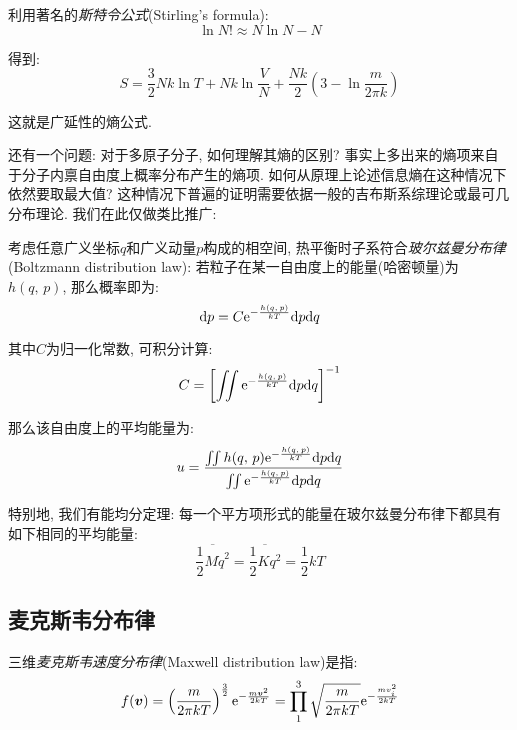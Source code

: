 利用著名的\emph{斯特令公式}(Stirling's formula):
\[\ln N!\approx N\ln N-N\]

得到:
\[S=\frac{3}{2}Nk\ln T+Nk\ln \frac{V}{N}+\frac{Nk}{2}\left(3-\ln{\frac{m}{2\pi k}}\right)\]

这就是广延性的熵公式.

还有一个问题: 对于多原子分子, 如何理解其熵的区别? 事实上多出来的熵项来自于分子内禀自由度上概率分布产生的熵项. 如何从原理上论述信息熵在这种情况下依然要取最大值? 这种情况下普遍的证明需要依据一般的吉布斯系综理论或最可几分布理论. 我们在此仅做类比推广: 

考虑任意广义坐标$q$和广义动量$p$构成的相空间, 热平衡时子系符合\emph{玻尔兹曼分布律}(Boltzmann distribution law): 若粒子在某一自由度上的能量(哈密顿量)为$h(q,\,p)$, 那么概率即为:
\[\textrm{d} p=C{\rm e}^{-\frac{h(q,\,p)}{kT}}\textrm{d} p\textrm{d} q\]

其中$C$为归一化常数, 可积分计算:
\[C=\left[\iint {\rm e}^{-\frac{h(q,\,p)}{kT}}\textrm{d} p\textrm{d} q\right]^{-1}\]

那么该自由度上的平均能量为:
\[u=\frac{\iint h(q,\,p){\rm e}^{-\frac{h(q,\,p)}{kT}}\textrm{d} p\textrm{d} q}{\iint {\rm e}^{-\frac{h(q,\,p)}{kT}}\textrm{d} p\textrm{d} q}\]

特别地, 我们有能均分定理: 每一个平方项形式的能量在玻尔兹曼分布律下都具有如下相同的平均能量:
\[\overline{\frac{1}{2}M\dot{q}^2}=\overline{\frac{1}{2}Kq^2}=\frac{1}{2}kT\]

\subsection{麦克斯韦分布律}

三维\emph{麦克斯韦速度分布律}(Maxwell distribution law)是指:
\[f(\boldsymbol{v})=\left(\frac{m}{2\pi kT}\right)^\frac{3}{2}{\rm e}^{-\frac{m\boldsymbol{v}^2}{2kT}}=\prod_1^3 \sqrt{\frac{m}{2\pi kT}}{\rm e}^{-\frac{mv_i^2}{2kT}}\]

